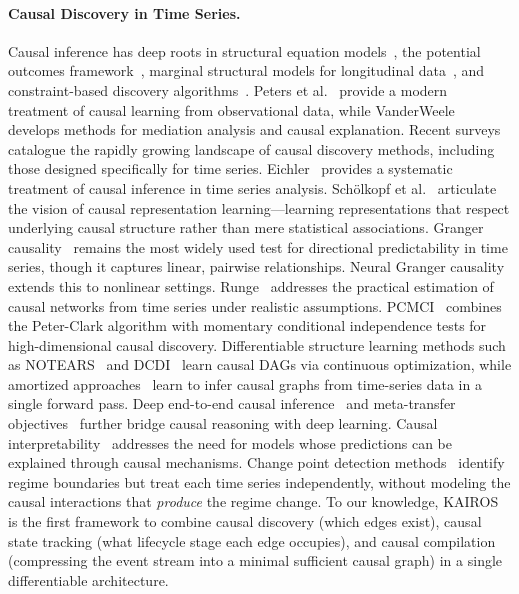 \documentclass[11pt]{article}
\begin{document}
\paragraph{Causal Discovery in Time Series.}
Causal inference has deep roots in structural equation models~\citep{pearl2009causality}, the potential outcomes framework~\citep{imbens2015causal}, marginal structural models for longitudinal data~\citep{robins2000marginal}, and constraint-based discovery algorithms~\citep{spirtes2000causation}. Peters et al.~\citep{peters2017elements} provide a modern treatment of causal learning from observational data, while VanderWeele~\citep{vanderweele2015explanation} develops methods for mediation analysis and causal explanation. Recent surveys~\citep{glymour2019review,assaad2022survey} catalogue the rapidly growing landscape of causal discovery methods, including those designed specifically for time series. Eichler~\citep{eichler2012causal} provides a systematic treatment of causal inference in time series analysis. Sch{\"o}lkopf et al.~\citep{scholkopf2021toward} articulate the vision of causal representation learning---learning representations that respect underlying causal structure rather than mere statistical associations. Granger causality~\citep{granger1969} remains the most widely used test for directional predictability in time series, though it captures linear, pairwise relationships. Neural Granger causality~\citep{tank2022neural_granger} extends this to nonlinear settings. Runge~\citep{runge2018causal} addresses the practical estimation of causal networks from time series under realistic assumptions. PCMCI~\citep{runge2019pcmci} combines the Peter-Clark algorithm with momentary conditional independence tests for high-dimensional causal discovery. Differentiable structure learning methods such as NOTEARS~\citep{zheng2018dags} and DCDI~\citep{brouillard2020differentiable} learn causal DAGs via continuous optimization, while amortized approaches~\citep{lowe2022amortized} learn to infer causal graphs from time-series data in a single forward pass. Deep end-to-end causal inference~\citep{geffner2022deep} and meta-transfer objectives~\citep{bengio2020metatransfer} further bridge causal reasoning with deep learning. Causal interpretability~\citep{moraffah2021causal} addresses the need for models whose predictions can be explained through causal mechanisms. Change point detection methods~\citep{aminikhanghahi2017changepoint,adams2007bocpd} identify regime boundaries but treat each time series independently, without modeling the causal interactions that \emph{produce} the regime change. To our knowledge, KAIROS is the first framework to combine causal discovery (which edges exist), causal state tracking (what lifecycle stage each edge occupies), and causal compilation (compressing the event stream into a minimal sufficient causal graph) in a single differentiable architecture.
\end{document}
